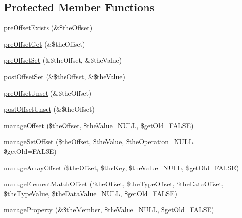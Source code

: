 \subsection*{Protected Member Functions}
\begin{DoxyCompactItemize}
\item 
\hyperlink{class_ontology_wrapper_1_1_container_object_ae03602f378081e220f8e6280d75bdc3e}{pre\-Offset\-Exists} (\&\$the\-Offset)
\item 
\hyperlink{class_ontology_wrapper_1_1_container_object_a7053dffd7fc10440eebfecd74e73d4af}{pre\-Offset\-Get} (\&\$the\-Offset)
\item 
\hyperlink{class_ontology_wrapper_1_1_container_object_ab7d07dda2c4b88ffa98b41d48814d03f}{pre\-Offset\-Set} (\&\$the\-Offset, \&\$the\-Value)
\item 
\hyperlink{class_ontology_wrapper_1_1_container_object_a0fa0ab4b7e742d00f2daa9206aa0b44a}{post\-Offset\-Set} (\&\$the\-Offset, \&\$the\-Value)
\item 
\hyperlink{class_ontology_wrapper_1_1_container_object_ae9f60cec5e7e40aed32c51dd7efa0429}{pre\-Offset\-Unset} (\&\$the\-Offset)
\item 
\hyperlink{class_ontology_wrapper_1_1_container_object_ada715084328ddac15b67491ea7c8e8cb}{post\-Offset\-Unset} (\&\$the\-Offset)
\item 
\hyperlink{class_ontology_wrapper_1_1_container_object_a9858b2ffc8e2c3474f1cc0f7a01df8d5}{manage\-Offset} (\$the\-Offset, \$the\-Value=N\-U\-L\-L, \$get\-Old=F\-A\-L\-S\-E)
\item 
\hyperlink{class_ontology_wrapper_1_1_container_object_a3fbfa8a211060c0407db32f31eba101b}{manage\-Set\-Offset} (\$the\-Offset, \$the\-Value, \$the\-Operation=N\-U\-L\-L, \$get\-Old=F\-A\-L\-S\-E)
\item 
\hyperlink{class_ontology_wrapper_1_1_container_object_aa0d380cae8b4eef94d7d9ba0098b1454}{manage\-Array\-Offset} (\$the\-Offset, \$the\-Key, \$the\-Value=N\-U\-L\-L, \$get\-Old=F\-A\-L\-S\-E)
\item 
\hyperlink{class_ontology_wrapper_1_1_container_object_ac54aca8b612d63b316350e8d9d82ebea}{manage\-Element\-Match\-Offset} (\$the\-Offset, \$the\-Type\-Offset, \$the\-Data\-Offset, \$the\-Type\-Value, \$the\-Data\-Value=N\-U\-L\-L, \$get\-Old=F\-A\-L\-S\-E)
\item 
\hyperlink{class_ontology_wrapper_1_1_container_object_afab5ff7dc87cde93bc899be69ffc7d21}{manage\-Property} (\&\$the\-Member, \$the\-Value=N\-U\-L\-L, \$get\-Old=F\-A\-L\-S\-E)
\end{DoxyCompactItemize}


